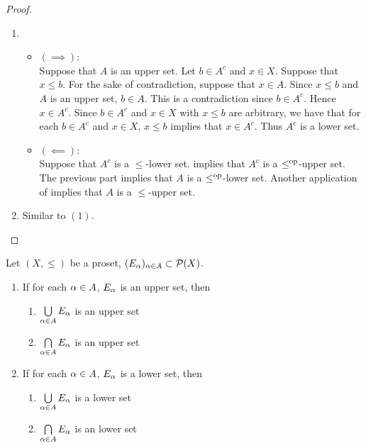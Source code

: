 \documentclass{book}
\begin{document}
	\begin{proof}\
		\begin{enumerate}
			\item 
			\begin{itemize}
				\item $(\implies)$: \\
				Suppose that $A$ is an upper set. Let $b \in A^c$ and $x \in X$. Suppose that $x \leq b$. For the sake of contradiction, suppose that $x \in A$. Since $x \leq b$ and $A$ is an upper set, $b \in A$. This is a contradiction since $b \in A^c$. Hence $x \in A^c$. Since $b \in A^c$ and $x \in X$ with $x \leq b$ are arbitrary, we have that for each $b \in A^c$ and $x \in X$, $x \leq b$ implies that $x \in A^c$. Thus $A^c$ is a lower set.
				\item $(\impliedby)$: \\
				Suppose that $A^c$ is a $\leq$-lower set.  implies that $A^c$ is a $\leq^{\text{op}}$-upper set. The previous part implies that $A$ is a $\leq^{\text{op}}$-lower set. Another application of  implies that $A$ is a $\leq$-upper set. 
			\end{itemize}
			\item Similar to $(1)$.
		\end{enumerate}
	\end{proof}
	
	\begin{ex} 
		Let $(X, \leq)$ be a proset, $(E_{\alpha})_{\alpha \in A} \subset \mathcal{P}(X)$. 
		\begin{enumerate}
			\item If for each $\alpha \in A$, $E_{\alpha}$ is an upper set, then 
			\begin{enumerate}
				\item $\bigcup\limits_{\alpha \in A} E_{\alpha}$ is an upper set
				\item $\bigcap\limits_{\alpha \in A} E_{\alpha}$ is an upper set
			\end{enumerate}
			\item If for each $\alpha \in A$, $E_{\alpha}$ is a lower set, then 
			\begin{enumerate}
				\item $\bigcup\limits_{\alpha \in A} E_{\alpha}$ is a lower set
				\item $\bigcap\limits_{\alpha \in A} E_{\alpha}$ is an lower set
			\end{enumerate}
		\end{enumerate}
	\end{ex}
	
\end{document}
